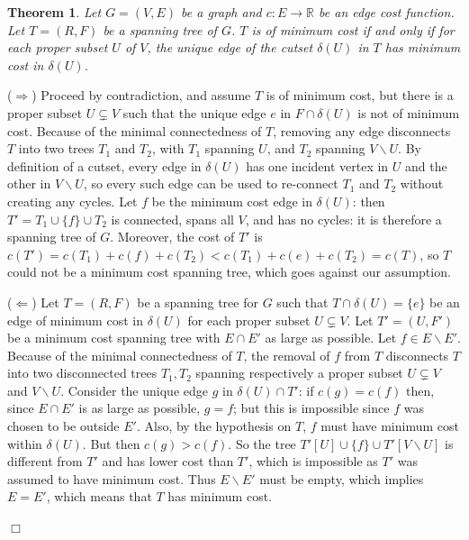 \documentclass[a4paper]{book}
\theoremstyle{changebreak}                %
\newtheorem{thm}[result]{Theorem}
\newenvironment{proof}
 {{\sl Proof.}\hspace*{1 ex}}%
 {{\nopagebreak\hspace*{\fill}$\Box$\par\vspace{12pt}}}
\begin{document}
\begin{thm}
Let $G=(V,E)$ be a graph and $c:E\to\mathbb{R}$ be an edge cost
function. Let $T=(R,F)$ be a spanning tree
of $G$. $T$ is of minimum cost if and only if for each proper subset
$U$ of $V$, the unique edge of the cutset
$\delta(U)$ in $T$ has minimum cost in $\delta(U)$.
\label{thm:sptree}
\end{thm}
\begin{proof}
($\Rightarrow$) Proceed by contradiction, and assume $T$ is of minimum
  cost, but there is a proper subset $U\subsetneq V$ such that the
  unique edge $e$ in $F\cap\delta(U)$ is not of minimum cost. Because
  of the minimal connectedness of $T$,
  removing any edge disconnects $T$ into two trees $T_1$
  and $T_2$, with $T_1$ spanning $U$, and $T_2$ spanning
  $V\smallsetminus U$. By definition of a cutset, every edge in
  $\delta(U)$ has one incident vertex in $U$
  and the other in $V\smallsetminus U$, so every such edge can be used
  to re-connect $T_1$ and $T_2$ without creating any
  cycles. Let $f$ be the minimum cost edge in
  $\delta(U)$: then $T'=T_1\cup\{f\}\cup T_2$ is connected, spans all
  $V$, and has no cycles: it is therefore a spanning tree of
  $G$. Moreover, the cost of $T'$ is
  $c(T')=c(T_1)+c(f)+c(T_2)<c(T_1)+c(e)+c(T_2)=c(T)$, so $T$ could not
  be a minimum cost spanning tree, which goes against our assumption.

($\Leftarrow$) Let $T=(R,F)$ be a spanning tree for $G$ such that
  $T\cap\delta(U)=\{e\}$ be an edge of minimum cost in $\delta(U)$ for
  each proper subset $U\subsetneq V$. Let $T'=(U,F')$ be a minimum
  cost spanning tree with $E\cap E'$ as large as possible. Let $f\in
  E\smallsetminus E'$. Because of the minimal connectedness of $T$,
  the removal of $f$ from $T$ disconnects $T$
  into two disconnected trees $T_1,T_2$ spanning respectively a proper
  subset $U\subsetneq V$ and $V\smallsetminus
  U$. Consider the unique edge $g$ in $\delta(U)\cap T'$: if
  $c(g)=c(f)$ then, since $E\cap E'$ is as large as possible, $g=f$;
  but this is impossible since $f$ was chosen to be outside
  $E'$. Also, by the hypothesis on $T$, $f$ must have minimum cost
  within $\delta(U)$. But then $c(g)>c(f)$. So the tree
  $T'[U]\cup\{f\}\cup T'[V\smallsetminus U]$ is different from $T'$
  and has lower cost than $T'$, which is impossible as $T'$ was
  assumed to have minimum cost. Thus $E\smallsetminus E'$ must be
  empty, which implies $E=E'$, which means that $T$ has minimum cost.
\end{proof}
\end{document}
